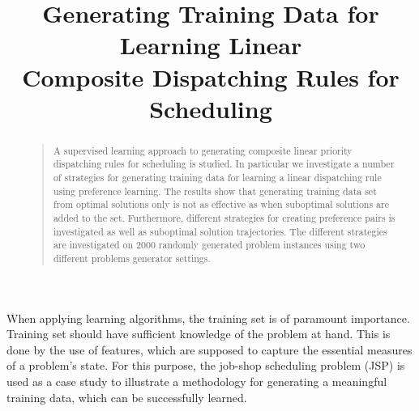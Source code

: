\documentclass[letterpaper]{article}
\begin{document}
%
\title{Generating Training Data for Learning Linear \\ Composite Dispatching Rules for Scheduling}
\author{ %
}
\maketitle
\begin{abstract}
\begin{quote}
A supervised learning approach to generating composite linear priority dispatching rules for scheduling is studied. In particular we investigate a number of strategies for generating training data for learning a linear dispatching rule using preference learning. The results show that generating training data set from optimal solutions only is not as effective as when suboptimal solutions are added to the set. Furthermore, different strategies for creating preference pairs is investigated as well as suboptimal solution trajectories. The different strategies are investigated on 2000 randomly generated problem instances using two different problems generator settings.
\end{quote}
\end{abstract}


\noindent When applying learning algorithms, the training set is of paramount importance. Training set should have sufficient knowledge of the problem at hand. This is done by the use of features, which are supposed to capture the essential measures of a problem's state. For this purpose, the job-shop scheduling problem (JSP) is used as a case study to illustrate a methodology for generating a meaningful training data, which can be successfully learned. 
\end{document}
